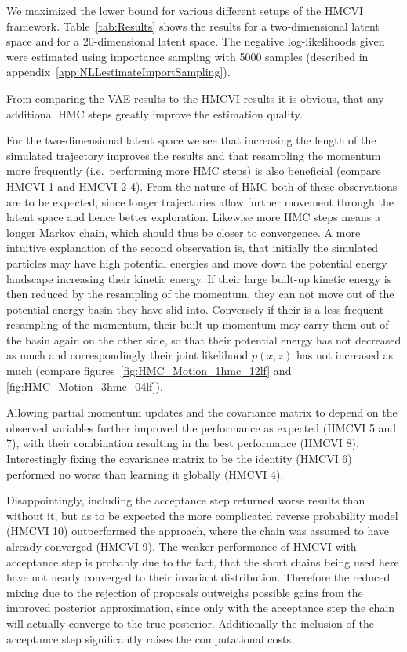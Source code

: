 We maximized the lower bound for various different setups of the HMCVI framework. Table~\ref{tab:Results} shows the results for a two-dimensional latent space and for a 20-dimensional latent space. The negative log-likelihoods given were estimated using importance sampling with 5000 samples (described in appendix~\ref{app:NLLestimateImportSampling}).

From comparing the VAE results to the HMCVI results it is obvious, that any additional HMC steps greatly improve the estimation quality. 

For the two-dimensional latent space we see that increasing the length of the simulated trajectory improves the results and that resampling the momentum more frequently (i.e.\ performing more HMC steps) is also beneficial (compare HMCVI 1 and HMCVI 2-4). From the nature of HMC both of these observations are to be expected, since longer trajectories allow further movement through the latent space and hence better exploration. Likewise more HMC steps means a longer Markov chain, which should thus be closer to convergence. A more intuitive explanation of the second observation is, that initially the simulated particles may have high potential energies and move down the potential energy landscape increasing their kinetic energy. If their large built-up kinetic energy is then reduced by the resampling of the momentum, they can not move out of the potential energy basin they have slid into. Conversely if their is a less frequent resampling of the momentum, their built-up momentum may carry them out of the basin again on the other side, so that their potential energy has not decreased as much and correspondingly their joint likelihood $p(x, z)$ has not increased as much (compare figures~\ref{fig:HMC_Motion_1hmc_12lf} and \ref{fig:HMC_Motion_3hmc_04lf}).

Allowing partial momentum updates and the covariance matrix to depend on the observed variables further improved the performance as expected (HMCVI 5 and 7), with their combination resulting in the best performance (HMCVI 8). Interestingly fixing the covariance matrix to be the identity  (HMCVI 6) performed no worse than learning it globally (HMCVI 4).

Disappointingly, including the acceptance step returned worse results than without it, but as to be expected the more complicated reverse probability model (HMCVI 10) outperformed the approach, where the chain was assumed to have already converged (HMCVI 9). The weaker performance of HMCVI with acceptance step is probably due to the fact, that the short chains being used here have not nearly converged to their invariant distribution. Therefore the reduced mixing due to the rejection of proposals outweighs possible gains from the improved posterior approximation, since only with the acceptance step the chain will actually converge to the true posterior. Additionally the inclusion of the acceptance step significantly raises the computational costs.
